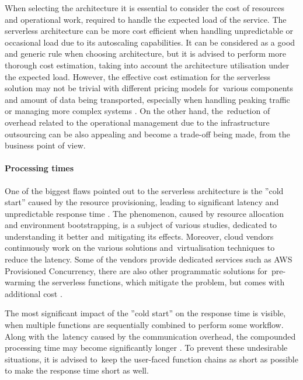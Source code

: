 When selecting the architecture it is essential to consider the cost of resources and operational work, required to handle the expected load of the service.
The serverless architecture can be more cost efficient when handling unpredictable or occasional load due to its autoscaling capabilities. It can be considered as a good and generic rule when choosing architecture, but it is advised to perform more thorough cost estimation, taking into account the architecture utilisation under the expected load.
However, the effective cost estimation for the serverless solution may not be trivial with different pricing models for~various components and amount of data being transported, especially when handling peaking traffic or managing more complex systems \cite{EvaluationOfServerlessApplicationProgrammingModel}.
On the other hand, the~reduction of overhead related to the operational management due to the infrastructure outsourcing can be also appealing and become a trade-off being made, from the business point of view.

\paragraph{Processing times} \label{chapter:serverless-suitability-processing-time}
 
One of the biggest flaws pointed out to the serverless architecture is the ''cold start'' caused by the resource provisioning, leading to significant latency and unpredictable response time \cite{BerkeleyServerless}.
The phenomenon, caused by resource allocation and environment bootstrapping, is a subject of various studies, dedicated to understanding it better and~mitigating its effects. Moreover, cloud vendors continuously work on the various solutions and~virtualisation techniques to reduce the latency. Some of the vendors provide dedicated services such as AWS Provisioned Concurrency, there are also other programmatic solutions for~pre-warming the serverless functions, which mitigate the problem, but comes with additional cost \cite{MartinFowlerServerless}.

The most significant impact of the ''cold start'' on the response time is visible, when multiple functions are sequentially combined to perform some workflow. Along with the~latency caused by the communication overhead, the compounded processing time may become significantly longer \cite{EvaluationOfServerlessApplicationProgrammingModel}.
To prevent these undesirable situations, it is advised to~keep the user-faced function chains as short as possible to make the response time short as well.

